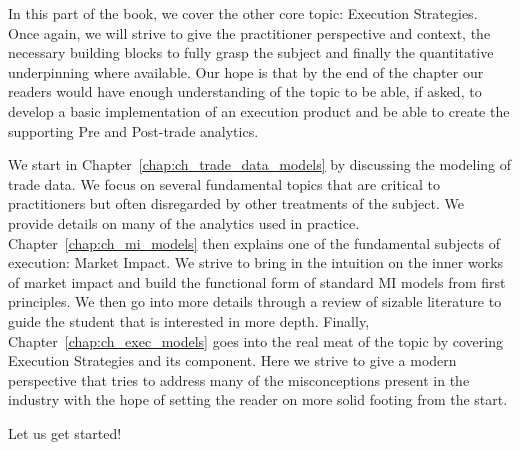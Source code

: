 
In this part of the book, we cover the other core topic: Execution Strategies. Once again, we will strive to give the practitioner perspective and context, the necessary building blocks to fully grasp the subject and finally the quantitative underpinning where available.  Our hope is that by the end of the chapter our readers would have enough understanding of the topic to be able, if asked, to develop a basic implementation of an execution product and be able to create the supporting Pre and Post-trade analytics.


We start in Chapter~\ref{chap:ch_trade_data_models} by discussing the modeling of trade data. We focus on several fundamental topics that are critical to practitioners but often disregarded by other treatments of the subject. We provide details on many of the analytics used in practice. Chapter~\ref{chap:ch_mi_models} then explains one of the fundamental subjects of execution: Market Impact. We strive to bring in the intuition on the inner works of market impact and build the functional form of standard MI models from first principles. We then go into more details through a review of  sizable literature to guide the student that is interested in more depth. Finally, Chapter~\ref{chap:ch_exec_models} goes into the real meat of the topic by covering Execution Strategies and its component. Here we strive to give a modern perspective that tries to address many of the misconceptions present in the industry with the hope of setting the reader on more solid footing from the start.


Let us get started!